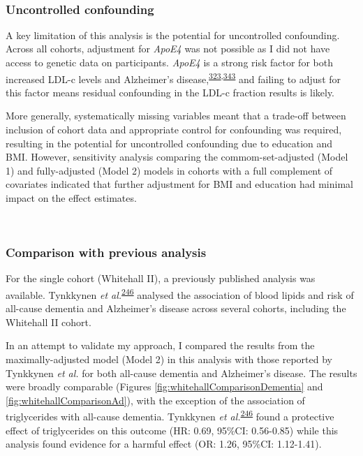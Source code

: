 \documentclass[a4paper, twoside]{templates/ociamthesis}
\begin{document}
~

\hypertarget{uncontrolled-confounding}{%
\subsubsection{Uncontrolled confounding}\label{uncontrolled-confounding}}

A key limitation of this analysis is the potential for uncontrolled confounding. Across all cohorts, adjustment for \emph{ApoE4} was not possible as I did not have access to genetic data on participants. \emph{ApoE4} is a strong risk factor for both increased LDL-c levels and Alzheimer's disease,\textsuperscript{\protect\hyperlink{ref-bennet2007}{323},\protect\hyperlink{ref-safieh2019}{343}} and failing to adjust for this factor means residual confounding in the LDL-c fraction results is likely.

More generally, systematically missing variables meant that a trade-off between inclusion of cohort data and appropriate control for confounding was required, resulting in the potential for uncontrolled confounding due to education and BMI. However, sensitivity analysis comparing the commom-set-adjusted (Model 1) and fully-adjusted (Model 2) models in cohorts with a full complement of covariates indicated that further adjustment for BMI and education had minimal impact on the effect estimates.

~

\hypertarget{comparison-with-previous-analysis}{%
\subsubsection{Comparison with previous analysis}\label{comparison-with-previous-analysis}}

For the single cohort (Whitehall II), a previously published analysis was available. Tynkkynen \emph{et al.}\textsuperscript{\protect\hyperlink{ref-tynkkynen2018}{246}} analysed the association of blood lipids and risk of all-cause dementia and Alzheimer's disease across several cohorts, including the Whitehall II cohort.

In an attempt to validate my approach, I compared the results from the maximally-adjusted model (Model 2) in this analysis with those reported by Tynkkynen \emph{et al.} for both all-cause dementia and Alzheimer's disease. The results were broadly comparable (Figures \ref{fig:whitehallComparisonDementia} and \ref{fig:whitehallComparisonAd}), with the exception of the association of triglycerides with all-cause dementia. Tynkkynen \emph{et al.}\textsuperscript{\protect\hyperlink{ref-tynkkynen2018}{246}} found a protective effect of triglycerides on this outcome (HR: 0.69, 95\%CI: 0.56-0.85) while this analysis found evidence for a harmful effect (OR: 1.26, 95\%CI: 1.12-1.41).
\end{document}
